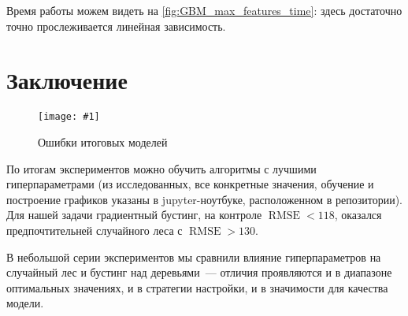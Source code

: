 \documentclass[12pt]{article}
\newcommand{\mpl}[2]{
    \begin{figure}[!h]
        \texttt{[image: \#1]}
        \centering
        \caption{#2}
        \label{fig:#1}
     \end{figure}
}
\begin{document}
Время работы можем видеть на \autoref{fig:GBM_max_features_time}: здесь достаточно точно прослеживается линейная зависимость.

\section{Заключение}
\mpl{conclusion}{Ошибки итоговых моделей}

По итогам экспериментов можно обучить алгоритмы с лучшими гиперпараметрами (из исследованных, все конкретные значения, обучение и построение графиков указаны в jupyter-ноутбуке, расположенном в репозитории).
Для нашей задачи градиентный бустинг, на контроле $\operatorname{RMSE}<118$, оказался предпочтительней случайного леса с $\operatorname{RMSE}>130$.

В небольшой серии экспериментов мы сравнили влияние гиперпараметров на случайный лес и бустинг над деревьями~--- отличия проявляются и в диапазоне оптимальных значениях, и в стратегии настройки, и в значимости для качества модели. 
\end{document}
